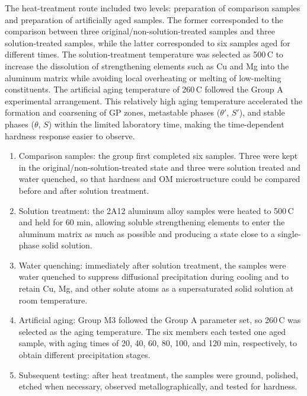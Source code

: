 \documentclass[12pt,a4paper,fontset=none]{ctexart}
\newcommand{\reportpara}[1]{%
  \noindent #1\par
}
\begin{document}
\reportpara{The heat-treatment route included two levels: preparation of comparison samples and preparation of artificially aged samples. The former corresponded to the comparison between three original/non-solution-treated samples and three solution-treated samples, while the latter corresponded to six samples aged for different times. The solution-treatment temperature was selected as 500\,\textdegree C to increase the dissolution of strengthening elements such as Cu and Mg into the aluminum matrix while avoiding local overheating or melting of low-melting constituents. The artificial aging temperature of 260\,\textdegree C followed the Group A experimental arrangement. This relatively high aging temperature accelerated the formation and coarsening of GP zones, metastable phases ($\theta'$, $S'$), and stable phases ($\theta$, $S$) within the limited laboratory time, making the time-dependent hardness response easier to observe.}
\begin{enumerate}[label=(\arabic*)]
\item Comparison samples: the group first completed six samples. Three were kept in the original/non-solution-treated state and three were solution treated and water quenched, so that hardness and OM microstructure could be compared before and after solution treatment.
\item Solution treatment: the 2A12 aluminum alloy samples were heated to 500\,\textdegree C and held for 60 min, allowing soluble strengthening elements to enter the aluminum matrix as much as possible and producing a state close to a single-phase solid solution.
\item Water quenching: immediately after solution treatment, the samples were water quenched to suppress diffusional precipitation during cooling and to retain Cu, Mg, and other solute atoms as a supersaturated solid solution at room temperature.
\item Artificial aging: Group M3 followed the Group A parameter set, so 260\,\textdegree C was selected as the aging temperature. The six members each tested one aged sample, with aging times of 20, 40, 60, 80, 100, and 120 min, respectively, to obtain different precipitation stages.
\item Subsequent testing: after heat treatment, the samples were ground, polished, etched when necessary, observed metallographically, and tested for hardness.
\end{enumerate}
\end{document}
